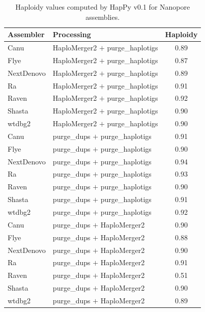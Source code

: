 \begin{suppsection}
\begin{table}[ht]
\centering
\caption{Haploidy values computed by HapPy v0.1 for Nanopore assemblies.}
\begin{tabular}{llc}
\hline
\textbf{Assembler} & \textbf{Processing} & \textbf{Haploidy} \\
\hline
Canu & HaploMerger2 $+$ purge\_haplotigs & 0.89 \\
Flye & HaploMerger2 $+$ purge\_haplotigs & 0.87 \\
NextDenovo & HaploMerger2 $+$ purge\_haplotigs & 0.89 \\
Ra & HaploMerger2 $+$ purge\_haplotigs & 0.91 \\
Raven & HaploMerger2 $+$ purge\_haplotigs & 0.92 \\
Shasta & HaploMerger2 $+$ purge\_haplotigs & 0.90 \\
wtdbg2 & HaploMerger2 $+$ purge\_haplotigs & 0.90 \\
Canu & purge\_dups $+$ purge\_haplotigs & 0.91 \\
Flye & purge\_dups $+$ purge\_haplotigs & 0.90 \\
NextDenovo & purge\_dups $+$ purge\_haplotigs & 0.94 \\
Ra & purge\_dups $+$ purge\_haplotigs & 0.93 \\
Raven & purge\_dups $+$ purge\_haplotigs & 0.90 \\
Shasta & purge\_dups $+$ purge\_haplotigs & 0.91 \\
wtdbg2 & purge\_dups $+$ purge\_haplotigs & 0.92 \\
Canu & purge\_dups $+$ HaploMerger2 & 0.90 \\
Flye & purge\_dups $+$ HaploMerger2 & 0.88 \\
NextDenovo & purge\_dups $+$ HaploMerger2 & 0.90 \\
Ra & purge\_dups $+$ HaploMerger2 & 0.91 \\
Raven & purge\_dups $+$ HaploMerger2 & 0.51 \\
Shasta & purge\_dups $+$ HaploMerger2 & 0.90 \\
wtdbg2 & purge\_dups $+$ HaploMerger2 & 0.89 \\
\hline
\end{tabular}
\label{tab:nanopore_happy_part3}
\end{table}


\end{suppsection}
